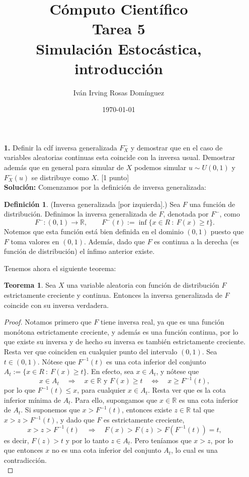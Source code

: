 \documentclass[letterpaper]{article}
\title{\textbf{Cómputo Científico\\ Tarea 5\\
Simulación Estocástica, introducción}}
\author{Iván Irving Rosas Domínguez}
\date{\today}
\newcommand{\R}{\mathbb{R}}
\renewcommand{\to}{\rightarrow}
\newcommand{\ent}{\Longrightarrow}
\newcommand{\1}{\mathds{1}}
\theoremstyle{definition}
\newtheorem{dfn}{Definición}
\theoremstyle{definition}
\newtheorem{teo}{Teorema}
\theoremstyle{definition}
\theoremstyle{definition}
\theoremstyle{definition}
\begin{document}
\maketitle


\begin{enumerate}
    \item[\textbf{1.}] Definir la cdf inversa generalizada $F_X^{-}$ y demostrar que en 
    el caso de variables aleatorias continuas esta coincide con la inversa usual. Demostrar
    además que en general para simular de $X$ podemos simular $u\sim U(0,1)$ y $F_X^{-}(u)$ se 
    distribuye como $X$. [1 punto]\\


    \textbf{Solución:} Comenzamos por la definición de inversa generalizada:
      \begin{dfn}(Inversa generalizada [por izquierda].) Sea $F$ una función de distribución. Definimos la 
        inversa generalizada de $F$, denotada por $F^{-}$, como 
        \[
        F^{-}:(0,1)\to \R, \qquad F^{-}(t):=\inf\{x\in R \ : \ F(x)\geq t\}.    
        \] 
        Notemos que esta función está bien definida en el dominio $(0,1)$ puesto que $F$ toma valores en $(0,1)$. 
        Además, dado que $F$ es continua a la derecha (es función de distribución) 
        el ínfimo anterior existe.
      \end{dfn}
      Tenemos ahora el siguiente teorema:
      \begin{teo}
        Sea $X$ una variable aleatoria con función de distribución $F$ estrictamente creciente y continua. Entonces 
        la inversa generalizada de $F$ coincide con su inversa verdadera.
      \end{teo}
      \begin{proof} 
        Notamos primero que $F$ tiene inversa real, ya que es una función monótona estrictamente creciente, y 
        además es una función continua, por lo que existe su inversa y de hecho su inversa es también 
        estrictamente creciente. Resta ver que coinciden en cualquier punto del intervalo $(0,1)$. Sea $t\in (0,1)$.
        Nótese que $F^{-1}(t)$ es una cota inferior del conjunto $A_t:=\{x\in R \ : \ F(x)\geq t\}$. En efecto, 
        sea $x\in A_t$, y nótese que
        \[
            x\in A_t \quad \ent \quad x\in \R \text{ y } F(x)\geq t \quad \Longleftrightarrow \quad x\geq F^{-1}(t),
        \]
        por lo que $F^{-1}(t)\leq x$, para cualquier $x\in A_t$. Resta ver que es la cota inferior mínima de $A_t$. 
        Para ello, supongamos que $x\in \R$ es una cota inferior de $A_t$. Si suponemos que $x>F^{-1}(t)$, entonces 
        existe $z\in \R$ tal que $x>z>F^{-1}(t)$, y dado que $F$ es estrictamente creciente, 
        \[
        x>z>F^{-1}(t) \quad \ent \quad F(x)>F(z)>F \left(F^{-1}(t)\right)=t,    
        \]
        es decir, $F(z)>t$ y por lo tanto $z\in A_t$. Pero teníamos que $x>z$, por lo que entonces $x$ no es una cota inferior
        del conjunto $A_t$, lo cual es una contradicción.\\


\end{proof}
\end{enumerate}
\end{document}
